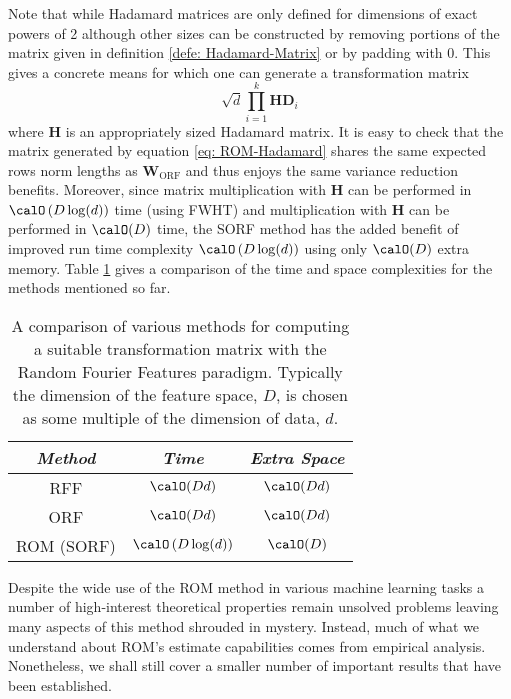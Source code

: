 Note that while Hadamard matrices are only defined for dimensions of exact powers of 2 although other sizes can be constructed by removing portions of the matrix given in definition \ref{defe: Hadamard-Matrix} or by padding with $0$. This gives a concrete means for which one can generate a transformation matrix
\begin{equation} \label{eq: ROM-Hadamard}
    \sqrt{d} \prod_{i=1}^{k} \bm{H} \bm{D}_{i}
\end{equation}
where $\bm{H}$ is an appropriately sized Hadamard matrix. It is easy to check that the matrix generated by equation \ref{eq: ROM-Hadamard} shares the same expected rows norm lengths as $\bm{W}_{\text{ORF}}$ and thus enjoys the same variance reduction benefits. Moreover, since matrix multiplication with $\bm{H}$ can be performed in $\calO \left( D \log (d) \right)$ time (using FWHT) and multiplication with $\bm{H}$ can be performed in $\calO (D)$ time, the SORF method has the added benefit of improved run time complexity $\calO \left( D \log (d) \right)$ using only $\calO (D)$ extra memory. Table \ref{table: RFF-compare} gives a comparison of the time and space complexities for the methods mentioned so far.

\begin{table}[h!]
    \centering
    \begin{tabular}{*3c}    \toprule
        \emph{Method}                                                  & \emph{Time}                       & \emph{Extra Space } \\\midrule
        RFF \cite{NIPS2007_013a006f}                                   & $\calO (Dd)$                      & $\calO (Dd)$        \\
        ORF \cite{YuFelixX2016ORF}                                     & $\calO (Dd)$                      & $\calO (Dd)$        \\
        ROM (SORF) \cite{YuFelixX2016ORF,ChoromanskiKrzysztof2017TUEo} & $\calO \left( D \log (d) \right)$ & $\calO (D)$         \\\bottomrule
        \hline
    \end{tabular}
    \caption{A comparison of various methods for computing a suitable transformation matrix with the Random Fourier Features paradigm. Typically the dimension of the feature space, $D$, is chosen as some multiple of the dimension of data, $d$.}
    \label{table: RFF-compare}
\end{table}

Despite the wide use of the ROM method in various machine learning tasks \cite{ChoromanskiKrzysztof2017TUEo,AndoniAlexandr2015PaOL,ChoromanskiKrzysztof2020RAwP,LiuFanghui2021RFfK} a number of high-interest theoretical properties remain unsolved problems leaving many aspects of this method shrouded in mystery. Instead, much of what we understand about ROM's estimate capabilities comes from empirical analysis. Nonetheless, we shall still cover a smaller number of important results that have been established.


